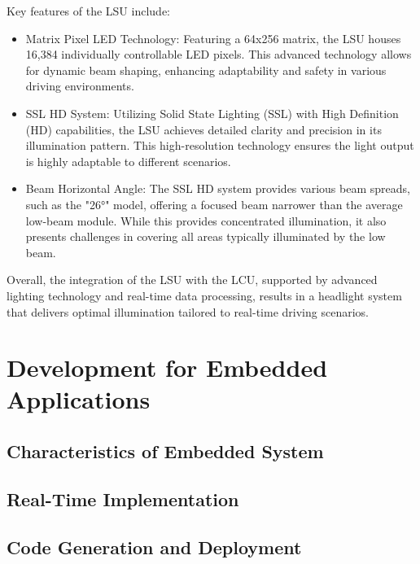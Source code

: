 Key features of the LSU include:
\begin{itemize}
    \item Matrix Pixel LED Technology: Featuring a 64x256 matrix, the LSU houses 16,384 individually controllable LED pixels. This advanced technology allows for dynamic beam shaping, enhancing adaptability and safety in various driving environments. \cite{7_Internal_Doc_HELLA}
    \item SSL HD System: Utilizing Solid State Lighting (SSL) with High Definition (HD) capabilities, the LSU achieves detailed clarity and precision in its illumination pattern. This high-resolution technology ensures the light output is highly adaptable to different scenarios. \cite{7_Internal_Doc_HELLA}
    \item Beam Horizontal Angle: The SSL HD system provides various beam spreads, such as the "26°" model, offering a focused beam narrower than the average low-beam module. While this provides concentrated illumination, it also presents challenges in covering all areas typically illuminated by the low beam. \cite{7_Internal_Doc_HELLA}
\end{itemize}


Overall, the integration of the LSU with the LCU, supported by advanced lighting technology and real-time data processing, results in a headlight system that delivers optimal illumination tailored to real-time driving scenarios.







\section{Development for Embedded Applications}




\subsection{Characteristics of Embedded System}

\subsection{Real-Time Implementation}

\subsection{Code Generation and Deployment}








